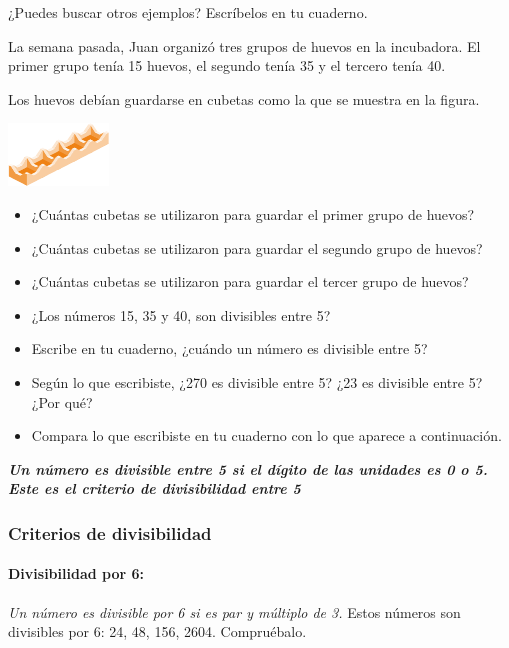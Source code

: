 \documentclass[10pt,twoside]{article}
\begin{document}
¿Puedes buscar otros ejemplos? Escríbelos en tu cuaderno.\\
\begin{minipage}{.7\textwidth}
La semana pasada, Juan organizó tres grupos de huevos en la incubadora. El primer grupo tenía 15 huevos, el segundo tenía 35 y el tercero tenía 40.

Los huevos debían guardarse en cubetas como la que se muestra en la figura.
\end{minipage}
\begin{minipage}{.25\textwidth}
 \begin{center}
 \includegraphics{./Images/minicubeta.png}
\end{center}
\end{minipage}
\begin{itemize}
 \item  ¿Cuántas cubetas se utilizaron para guardar el primer
grupo de huevos?
\item ¿Cuántas cubetas se utilizaron para guardar el segundo
grupo de huevos?
\item ¿Cuántas cubetas se utilizaron para guardar el tercer
grupo de huevos?
\item ¿Los números 15, 35 y 40, son divisibles entre 5?
\item Escribe en tu cuaderno, ¿cuándo un número es divisible
entre 5?
\item Según lo que escribiste, ¿270 es divisible entre 5? ¿23 es
divisible entre 5? ¿Por qué?
\item Compara lo que escribiste en tu cuaderno con lo que
aparece a continuación.
\end{itemize}
\emph{\textbf{Un número es divisible entre 5 si el dígito de las unidades es 0 o 5. Este es el criterio de divisibilidad entre 5}}
\begin{itemize}
\begin{multicols}{2}
 \item ¿98 es divisible entre 5?
 \item ¿5 es divisible entre 5?
 \end{multicol
\end{itemize}
\subsubsection*{Criterios de divisibilidad}
\paragraph*{Divisibilidad por 6:} \emph{Un número es divisible por 6 si es par y múltiplo de 3.}
Estos números son divisibles por 6: 24, 48, 156, 2604. Compruébalo.
\end{document}
